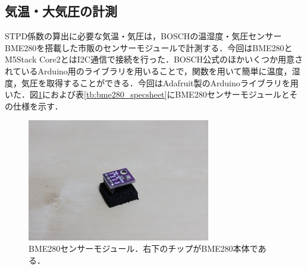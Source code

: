 
\subsection{気温・大気圧の計測}
\label{sec:measuring_ambient}

STPD係数の算出に必要な気温・気圧は，BOSCHの温湿度・気圧センサーBME280を搭載した市販のセンサーモジュールで計測する．今回はBME280とM5Stack Core2とはI2C通信で接続を行った．BOSCH公式のほかいくつか用意されているArduino用のライブラリを用いることで，関数を用いて簡単に温度，湿度，気圧を取得することができる．今回はAdafruit製のArduinoライブラリを用いた．図\ref{fig:bme280}におよび表\ref{tb:bme280_specsheet}にBME280センサーモジュールとその仕様を示す．

\begin{figure}[H]
  \begin{center}
    \includegraphics[width=8cm]{fig/bme280}
    \caption{BME280センサーモジュール．右下のチップがBME280本体である．}
    \label{fig:bme280}
  \end{center}
\end{figure}

